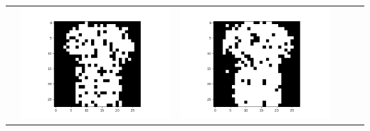\documentclass[12pt]{report}
\begin{document}
\begin{table}[H]
\begin{tabular}{ | c | c | c | c | c | c |}
\begin{minipage}{.3\textwidth}
    \end{minipage} &
    \begin{minipage}{.3\textwidth}
      \includegraphics[scale=0.2]{BM_a2.png}
    \end{minipage} &
    \begin{minipage}{.3\textwidth}
      \includegraphics[scale=0.2]{BM_a4.png}
    \end{minipage} &
    \begin{minipage}{.3\textwidth}

\end{minipage}
\end{tabular}
\end{table}
\end{document}
